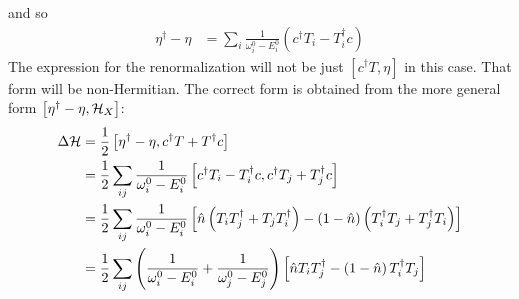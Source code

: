 \documentclass[12pt,twoside]{article}
\numberwithin{equation}{section}
\begin{document}
and so
\begin{equation}\begin{aligned}
	\eta^\dagger - \eta &= \sum_i \frac{1}{\omega^0_i - E^0_i}\left(c^\dagger T_i - T_i^\dagger c\right)
\end{aligned}\end{equation}
The expression for the renormalization will not be just \(\left[c^\dagger T, \eta \right]\) in this case. That form will be non-Hermitian. The correct form is obtained from the more general form \(\left[\eta^\dagger - \eta, \mathcal{H}_X \right]\):
\begin{equation}\begin{aligned}
	\Delta \mathcal{H} &= \frac{1}{2}\left[\eta^\dagger - \eta, c^\dagger T + T^\dagger c\right]\\
		    &= \frac{1}{2}\sum_{ij} \frac{1}{\omega^0_i - E^0_i}\left[c^\dagger T_i - T_i^\dagger c, c^\dagger T_j + T_j^\dagger c\right]\\
		    &= \frac{1}{2}\sum_{ij} \frac{1}{\omega^0_i - E^0_i}\left[\hat n \left(T_i T_j^\dagger + T_j T_i^\dagger \right) - \left(1 - \hat n\right)\left(T_i^\dagger T_j + T_j^\dagger T_i\right)\right]\\
		    &= \frac{1}{2}\sum_{ij} \left(\frac{1}{\omega^0_i - E^0_i} + \frac{1}{\omega^0_j - E^0_j}\right)\left[\hat n T_i T_j^\dagger - \left(1 - \hat n\right)T_i^\dagger T_j\right]\\ 
\end{aligned}\end{equation}
\end{document}
